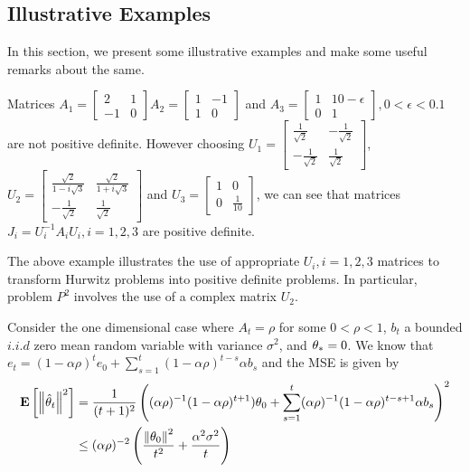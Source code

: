 \subsection{Illustrative Examples}
In this section, we present some illustrative examples and make some useful remarks about the same.
\begin{example}\label{ex:pdas}
Matrices $A_1=\begin{bmatrix} 2 &1 \\-1 &0\end{bmatrix}$$A_2=\begin{bmatrix}1 & -1\\ 1 &0 \end{bmatrix}$ and $A_3=\begin{bmatrix} 1 & 10-\epsilon \\ 0 &1 \end{bmatrix},0<\epsilon<0.1$ are not positive definite. However choosing $U_1=\begin{bmatrix} \frac{1}{\sqrt{2}}& -\frac{1}{\sqrt{2}}\\ -\frac{1}{\sqrt{2}} &\frac{1}{\sqrt{2}} \end{bmatrix}$, $U_2=\begin{bmatrix} \frac{\sqrt{2}}{1-i\sqrt{3}} & \frac{\sqrt{2}}{1+i\sqrt{3}} \\ -\frac{1}{\sqrt{2}} &\frac{1}{\sqrt{2}}\end{bmatrix}$ and $U_3=\begin{bmatrix} 1 & 0\\ 0 &\frac{1}{10} \end{bmatrix}$, we can see that matrices $J_i=U_i^{-1}A_i U_i,i=1,2,3$ are positive definite.
\end{example}
The above example  illustrates the use of appropriate $U_i,i=1,2,3$ matrices to transform Hurwitz problems into positive definite problems. In particular, problem $P^2$ involves the use of a complex matrix $U_2$.
\begin{example}\label{ex:geo}
Consider the one dimensional case where $A_t=\rho$ for some $0<\rho<1$, $b_t$ a bounded $i.i.d$ zero mean random variable with variance $\sigma^2$, and $\theta_*=0$. We know that $e_t=(1-\alpha\rho)^t e_0+\sum_{s=1}^t (1-\alpha \rho)^{t-s}\alpha b_s$ and the MSE is given by
\begin{align*}
\mathbf{E}\left[\left\| \hat{\theta}_t\right\|^2\right]&=\frac{1}{(t+1)^2}\left( (\alpha\rho)^{-1}(1-\alpha\rho)^{t+1}) \theta_0+ \sum_{s=1}^t (\alpha\rho)^{-1}(1-\alpha \rho)^{t-s+1} \alpha b_s\right)^2\\
&\leq (\alpha\rho)^{-2}\left(\frac{\left\| \theta_0\right\|^2}{t^2}+\frac{\alpha^2\sigma^2}{t}\right)
\end{align*}
\end{example}
